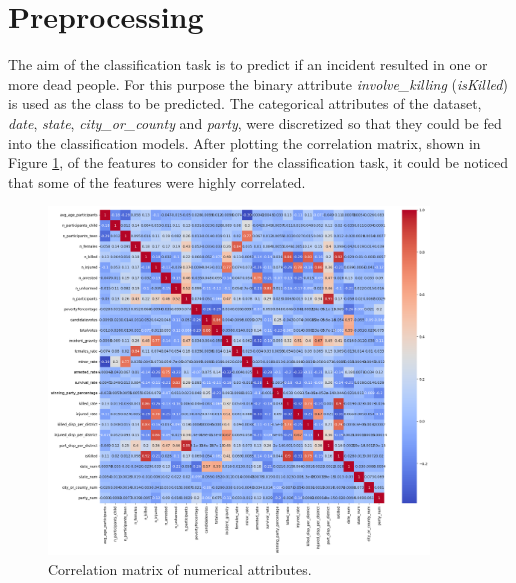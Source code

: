 \documentclass[10pt,a4paper]{report}
\begin{document}
\section{Preprocessing}

The aim of the classification task is to predict if an incident resulted in one or more dead people.
For this purpose the binary attribute \textit{involve\_killing} (\textit{isKilled}) is used as the class to be predicted.
The categorical attributes of the dataset, \textit{date}, \textit{state}, \textit{city\_or\_county} and \textit{party}, were discretized so that they could be fed into the classification models.
After plotting the correlation matrix, shown in Figure \ref{corr_matrix_class}, of the features to consider for the classification task, it could be noticed that some of the features were highly correlated.

\begin{figure}[b!]
	\includegraphics[width=0.9\textwidth]{corr_matrix_class}
	\centering
	\caption{Correlation matrix of numerical attributes.}
	\label{corr_matrix_class}
\end{figure}
\end{document}
